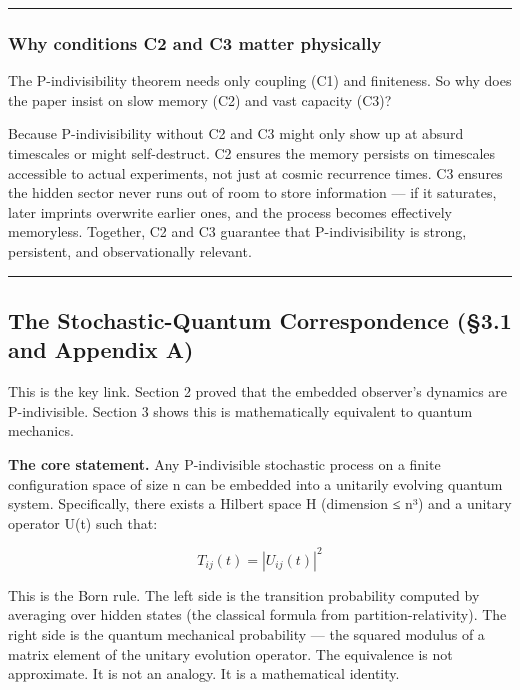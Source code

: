 \documentclass[
]{article}
\begin{document}
\begin{center}\rule{0.5\linewidth}{0.5pt}\end{center}

\hypertarget{why-conditions-c2-and-c3-matter-physically}{%
\subsubsection{Why conditions C2 and C3 matter
physically}\label{why-conditions-c2-and-c3-matter-physically}}

The P-indivisibility theorem needs only coupling (C1) and finiteness. So
why does the paper insist on slow memory (C2) and vast capacity (C3)?

Because P-indivisibility without C2 and C3 might only show up at absurd
timescales or might self-destruct. C2 ensures the memory persists on
timescales accessible to actual experiments, not just at cosmic
recurrence times. C3 ensures the hidden sector never runs out of room to
store information --- if it saturates, later imprints overwrite earlier
ones, and the process becomes effectively memoryless. Together, C2 and
C3 guarantee that P-indivisibility is strong, persistent, and
observationally relevant.

\begin{center}\rule{0.5\linewidth}{0.5pt}\end{center}

\hypertarget{the-stochastic-quantum-correspondence-3.1-and-appendix-a}{%
\subsection{The Stochastic-Quantum Correspondence (§3.1 and Appendix
A)}\label{the-stochastic-quantum-correspondence-3.1-and-appendix-a}}

This is the key link. Section 2 proved that the embedded observer's
dynamics are P-indivisible. Section 3 shows this is mathematically
equivalent to quantum mechanics.

\textbf{The core statement.} Any P-indivisible stochastic process on a
finite configuration space of size n can be embedded into a unitarily
evolving quantum system. Specifically, there exists a Hilbert space H
(dimension ≤ n³) and a unitary operator U(t) such that:

\[T_{ij}(t) = |U_{ij}(t)|^2\]

This is the Born rule. The left side is the transition probability
computed by averaging over hidden states (the classical formula from
partition-relativity). The right side is the quantum mechanical
probability --- the squared modulus of a matrix element of the unitary
evolution operator. The equivalence is not approximate. It is not an
analogy. It is a mathematical identity.
\end{document}
